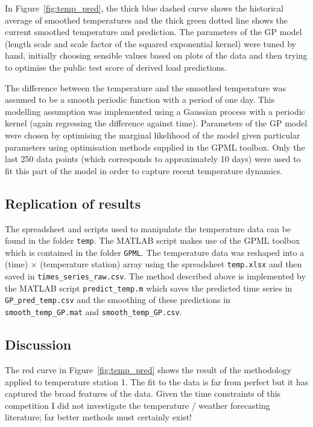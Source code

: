 In Figure~\ref{fig:temp_pred}, the thick blue dashed curve shows the historical average of smoothed temperatures and the thick green dotted line shows the current smoothed temperature and prediction.
The parameters of the GP model (length scale and scale factor of the squared exponential kernel) were tuned by hand, initially choosing sensible values based on plots of the data and then trying to optimise the public test score of derived load predictions.

The difference between the temperature and the smoothed temperature was assumed to be a smooth periodic function with a period of one day.
This modelling assumption was implemented using a Gaussian process with a periodic kernel (again regressing the difference against time).
Parameters of the GP model were chosen by optimising the marginal likelihood of the model given particular parameters using optimisation methods supplied in the GPML toolbox\footnotemark.
Only the last 250 data points (which corresponds to approximately 10 days) were used to fit this part of the model in order to capture recent temperature dynamics.

\subsection{Replication of results}

The spreadsheet and scripts used to manipulate the temperature data can be found in the folder \texttt{temp}.
The MATLAB script makes use of the GPML toolbox which is contained in the folder \texttt{GPML}.
The temperature data was reshaped into a (time) $\times$ (temperature station) array using the spreadsheet \texttt{temp.xlsx} and then saved in \texttt{times\_series\_raw.csv}.
The method described above is implemented by the MATLAB script \texttt{predict\_temp.m} which saves the predicted time series in \texttt{GP\_pred\_temp.csv} and the smoothing of these predictions in \texttt{smooth\_temp\_GP.mat} and \texttt{smooth\_temp\_GP.csv}.

\subsection{Discussion}

The red curve in Figure~\ref{fig:temp_pred} shows the result of the methodology applied to temperature station 1.
The fit to the data is far from perfect but it has captured the broad features of the data.
Given the time constraints of this competition I did not investigate the temperature / weather forecasting literature; far better methods must certainly exist!

